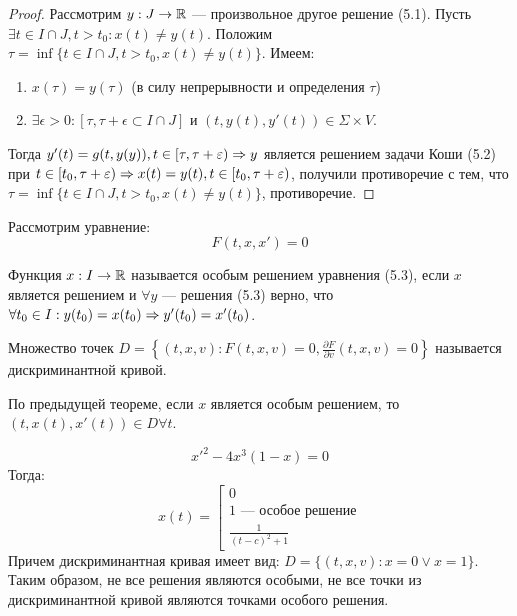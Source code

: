 \begin{proof}
    Рассмотрим \(y: J \rightarrow \mathbb{R}\) --- произвольное другое решение (5.1). Пусть \(\exists t \in I \cap J, t > t_0: x(t) \ne y(t)\). Положим \(\tau = \inf\{t \in I \cap J, t > t_0, x(t) \ne y(t)\}\). Имеем:
    \begin{enumerate}
        \item \(x(\tau) = y(\tau)\) (в силу непрерывности и определения \(\tau\))
        \item \(\exists \epsilon > 0: [\tau, \tau + \epsilon \subset I \cap J]\) и \((t, y(t), y'(t)) \in \Sigma \times V\).
    \end{enumerate}
    Тогда \(y'(t) = g(t, y(y)), t \in [\tau, \tau + \varepsilon) \Rightarrow y\) является решением задачи Коши (5.2) при \(t \in [t_0, \tau + \varepsilon) \Rightarrow x(t) = y(t), t \in [t_0, \tau + \varepsilon)\), получили противоречие с тем, что \(\tau = \inf\{t \in I \cap J, t > t_0, x(t) \ne y(t)\}\), противоречие.
\end{proof}

Рассмотрим уравнение:
\begin{equation}
    F(t, x, x') = 0
\end{equation}

\begin{definition}
    Функция \(x: I \rightarrow \mathbb{R}\) называется особым решением уравнения (5.3), если \(x\) является решением и \(\forall y\) --- решения (5.3) верно, что \(\forall t_0 \in I: y(t_0) = x(t_0) \Rightarrow y'(t_0) = x'(t_0)\).
\end{definition}

\begin{definition}
    Множество точек \(D = \left\{(t, x, v): F(t, x, v) = 0, \frac{\partial F}{\partial v}(t, x, v) = 0\right\}\) называется дискриминантной кривой.
\end{definition}

\begin{note}
    По предыдущей теореме, если \(x\) является особым решением, то \((t, x(t), x'(t)) \in D \forall t\).
\end{note}

\begin{example}
    \[x'^2 - 4x^3(1 - x) = 0\]
    Тогда:
    \[x(t) = \left[\begin{array}{l}
        0 \\
        1 \text{ --- особое решение}\\
        \frac{1}{(t - c)^2 + 1}
    \end{array}\right.\]
    Причем дискриминантная кривая имеет вид: \(D = \{(t, x, v): x = 0 \vee x = 1\}\). Таким образом, не все решения являются особыми, не все точки из дискриминантной кривой являются точками особого решения.
\end{example}

